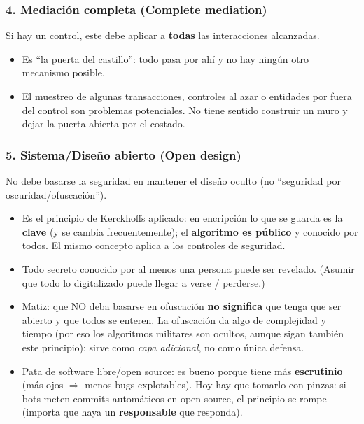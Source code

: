 \documentclass[../main.tex]{subfiles}
\begin{document}
\subsubsection{4. Mediación completa (Complete mediation)}
Si hay un control, este debe aplicar a \textbf{todas} las interacciones alcanzadas.
\begin{itemize}
  \item Es ``la puerta del castillo'': todo pasa por ahí y no hay ningún otro mecanismo posible.
  \item El muestreo de algunas transacciones, controles al azar o entidades por fuera del control son problemas potenciales. No tiene sentido construir un muro y dejar la puerta abierta por el costado.
\end{itemize}

\subsubsection{5. Sistema/Diseño abierto (Open design)}
No debe basarse la seguridad en mantener el diseño oculto (no ``seguridad por oscuridad/ofuscación'').
\begin{itemize}
  \item Es el principio de Kerckhoffs aplicado: en encripción lo que se guarda es la \textbf{clave} (y se cambia frecuentemente); el \textbf{algoritmo es público} y conocido por todos. El mismo concepto aplica a los controles de seguridad.
  \item Todo secreto conocido por al menos una persona puede ser revelado.  (Asumir que todo lo digitalizado puede llegar a verse / perderse.)
  \item Matiz: que NO deba basarse en ofuscación \textbf{no significa} que tenga que ser abierto y que todos se enteren. La ofuscación da algo de complejidad y tiempo (por eso los algoritmos militares son ocultos, aunque sigan también este principio); sirve como \emph{capa adicional}, no como única defensa.
  \item Pata de software libre/open source: es bueno porque tiene más \textbf{escrutinio} (más ojos $\Rightarrow$ menos bugs explotables). Hoy hay que tomarlo con pinzas: si bots meten commits automáticos en open source, el principio se rompe (importa que haya un \textbf{responsable} que responda).
\end{itemize}
\end{document}
